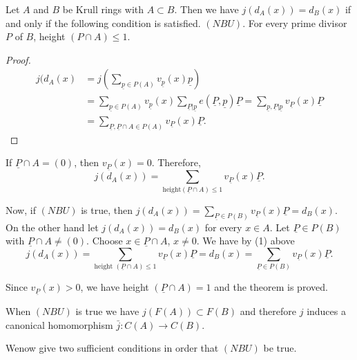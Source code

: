  \begin{theorem}\label{chap1:thm6.1} %
Let $A$ and $B$ be Krull rings with $A \subset B$. Then we have
  $j(d_A (x)) = d_B(x)$ if and only if the following condition is
  satisfied. $(NBU)$. For every prime divisor $P$ of $B$, height $(P
  \cap A) \le 1$.  
  \end{theorem}  
  
\begin{proof}
\begin{align*}
j (d_A(x) & = j(\sum_{\underline{p} \in P(A)} v_{\underline{p}} (x)
\underline{p})\\ 
& = \sum_{ \underline{p} \in P(A)} v_{\underline{p}} (x)
\sum_{\underline{P} | \underline{p}} e(\underline{P}, \underline{p})
\underline{P} = \sum_{\underline{p}, \underline{P} | \underline{p}}
v_{\underline{P}} (x) \underline{P}\\ 
& = \sum_{\underline{P}, \underline{P} \cap A \in P (A)}
v_{\underline{P}} (x) \underline{P}. 
\end{align*}
\end{proof}  
  
  \noindent
  If $\underline{P} \cap A = (0)$, then $v_{\underline{P}}(x) =
  0$. Therefore, 
  \begin{equation*}
j(d_A (x)) = \sum_{\text{height} (\underline{P} \cap A) \le 1}
v_{\underline{P}} (x) \underline{P}. \tag{1}\label{c1:eq1} 
  \end{equation*}   
  
  \noindent
  Now, if $(NBU)$ is true, then $j(d_A (x)) =
  \sum\limits_{\underline{P} \in P(B)} v_{\underline{P}}(x)
  \underline{P} = d_B (x) $. On the other hand let $j (d_A (x)) = d_B
  (x)$ for every $x \in A$. Let $\underline{P} \in P(B)$ with
  $\underline{P} \cap A \neq (0)$. Choose $x \in \underline{P} \cap A$,
  $x \neq 0$. We have by (1) above 
  $$
  j(d_A (x)) = \sum_{\text{height } (\underline{P} \cap A) \le 1}
  v_{\underline{P}} (x) \underline{P} = d_B(x) = \sum_{\underline{P}
    \in P (B)} v_{\underline{P}} (x) \underline{P}. 
  $$
  
  \noindent
  Since $v_{\underline{P}}(x) > 0$, we have height $(\underline{P}
  \cap A)=1$ and the theorem is proved. 
  
  When $(NBU)$ is true we have $j(F(A)) \subset F(B)$ and
  therefore $j$ induces a canonical homomorphism $\bar{j} : C(A)
  \rightarrow C(B)$. 
  
  We\pageoriginale now give two sufficient conditions in order that
  $(NBU)$ be true. 
  
